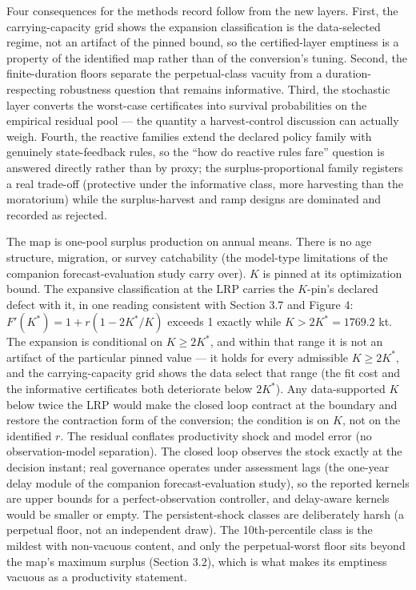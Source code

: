 Four consequences for the methods record follow from the new layers.
First, the carrying-capacity grid shows the expansion classification is
the data-selected regime, not an artifact of the pinned bound, so the
certified-layer emptiness is a property of the identified map rather
than of the conversion's tuning. Second, the finite-duration floors
separate the perpetual-class vacuity from a duration-respecting
robustness question that remains informative. Third, the stochastic
layer converts the worst-case certificates into survival probabilities
on the empirical residual pool --- the quantity a harvest-control
discussion can actually weigh. Fourth, the reactive families extend the
declared policy family with genuinely state-feedback rules, so the ``how
do reactive rules fare'' question is answered directly rather than by
proxy; the surplus-proportional family registers a real trade-off
(protective under the informative class, more harvesting than the
moratorium) while the surplus-harvest and ramp designs are dominated and
recorded as rejected.

The map is one-pool surplus production on annual means. There is no age
structure, migration, or survey catchability (the model-type limitations
of the companion forecast-evaluation study carry over). \(K\) is pinned
at its optimization bound. The expansive classification at the LRP
carries the \(K\)-pin's declared defect with it, in one reading
consistent with Section 3.7 and Figure 4:
\(F'(K^*) = 1 + r(1 - 2K^*/K)\) exceeds 1 exactly while
\(K > 2K^* = 1769.2\) kt. The expansion is conditional on
\(K \ge 2K^*\), and within that range it is not an artifact of the
particular pinned value --- it holds for every admissible
\(K \ge 2K^*\), and the carrying-capacity grid shows the data select
that range (the fit cost and the informative certificates both
deteriorate below \(2K^*\)). Any data-supported \(K\) below twice the
LRP would make the closed loop contract at the boundary and restore the
contraction form of the conversion; the condition is on \(K\), not on
the identified \(r\). The residual conflates productivity shock and
model error (no observation-model separation). The closed loop observes
the stock exactly at the decision instant; real governance operates
under assessment lags (the one-year delay module of the companion
forecast-evaluation study), so the reported kernels are upper bounds for
a perfect-observation controller, and delay-aware kernels would be
smaller or empty. The persistent-shock classes are deliberately harsh (a
perpetual floor, not an independent draw). The 10th-percentile class is
the mildest with non-vacuous content, and only the perpetual-worst floor
sits beyond the map's maximum surplus (Section 3.2), which is what makes
its emptiness vacuous as a productivity statement.

